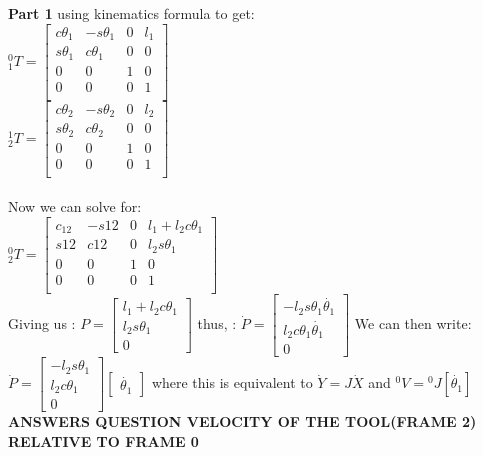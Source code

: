 \documentclass{article}
\begin{document}
\textbf{Part 1} using kinematics formula to get:\\
${}^0_1T=\begin{bmatrix}
c\theta_1 & -s\theta_1 & 0 & l_1 \\
s\theta_1 & c\theta_1 & 0 & 0 \\
0 & 0 & 1 & 0 \\
0 & 0 & 0 & 1 \\
\end{bmatrix}$\\
${}^1_2T=\begin{bmatrix}
c\theta_2 & -s\theta_2 & 0 & l_2 \\
s\theta_2 & c\theta_2 & 0 & 0 \\
0 & 0 & 1 & 0 \\
0 & 0 & 0 & 1 \\
\end{bmatrix}$\\\\
Now we can solve for:\\
${}^0_2T=\begin{bmatrix}
c_{12} & -s{12} & 0 & l_1 + l_2 c\theta_1\\
s{12} & c{12} & 0 & l_2 s\theta_1 \\
0 & 0 & 1 & 0 \\
0 & 0 & 0 & 1 \\
\end{bmatrix}$\\
Giving us : $P=\begin{bmatrix}
              l_1 + l_2 c\theta_1\\
              l_2 s\theta_1\\
              0
\end{bmatrix}$ thus, :
$\dot{P}=\begin{bmatrix}
    -l_2s\theta_1 \dot{\theta_1}\\
    l_2c\theta_1 \dot{\theta_1}\\
    0
\end{bmatrix}$ We can then write: $\dot{P}=\begin{bmatrix}
    -l_2s\theta_1\\
    l_2c\theta_1\\
    0
\end{bmatrix}\begin{bmatrix}
    \dot{\theta_1}
\end{bmatrix}$ where this is equivalent to $\dot{Y}=J\dot{X}$ and ${}^0V={}^0J[\dot{\theta_1}]$\\
\textbf{ANSWERS QUESTION VELOCITY OF THE TOOL(FRAME 2) RELATIVE TO FRAME 0}\\\\
\end{document}
